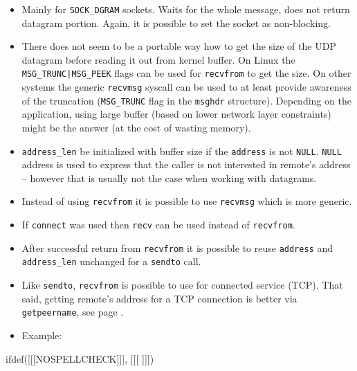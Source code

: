 \begin{itemize}
\item Mainly for \texttt{SOCK\_DGRAM} sockets. Waits for the whole message,
does not return datagram portion. Again, it is possible to set the socket
as non-blocking.
\item There does not seem to be a portable way how to get the size of the
UDP datagram before reading it out from kernel buffer. On Linux the
\texttt{MSG\_TRUNC|MSG\_PEEK} flags can be used for \texttt{recvfrom} to get the
size. On other systems the generic \texttt{recvmsg} syscall can be used to at
least provide awareness of the truncation (\texttt{MSG\_TRUNC} flag in the
\texttt{msghdr} structure).
Depending on the application, using large buffer (based on lower network layer
constraints) might be the answer (at the cost of wasting memory).
\item \texttt{address\_len}  be initialized with buffer size if
the \texttt{address} is not \texttt{NULL}. \texttt{NULL} address is used to
express that the caller is not interested in remote's address -- however that is
usually not the case when working with datagrams.
\item Instead of using \texttt{recvfrom} it is possible to use
\texttt{recvmsg} which is more generic.
\item If \texttt{connect} was used then \texttt{recv} can be used instead of
\texttt{recvfrom}.
\item After successful return from \texttt{recvfrom} it is possible to reuse
\texttt{address} and \texttt{address\_len} unchanged for a \texttt{sendto} call.
\item Like \texttt{sendto}, \texttt{recvfrom} is possible to use for connected
service (TCP). That said, getting remote's address for a TCP connection is
better via \texttt{getpeername}, see page \pageref{GETPEERNAME}.
\item Example:  
\end{itemize}


ifdef([[[NOSPELLCHECK]]], [[[
]]])

